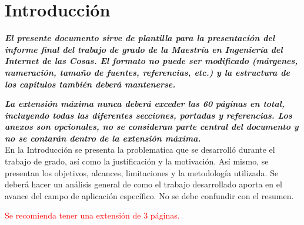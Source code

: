 \chapter{Introducción}\label{intro}

\textit{\textbf{El presente documento sirve de plantilla para la presentación del informe final del trabajo de grado de la Maestría en Ingeniería del Internet de las Cosas. El formato no puede ser modificado (márgenes, numeración, tamaño de fuentes, referencias, etc.) y la estructura de los capítulos también deberá mantenerse.}}

\textit{\textbf{La extensión máxima nunca deberá exceder las 60 páginas en total, incluyendo todas las diferentes secciones, portadas y referencias. Los anexos son opcionales, no se consideran parte central del documento y no se contarán dentro de la extensión máxima.}}\\[1.0cm]

En la Introducción se presenta la problematica que se desarrolló durante el trabajo de grado, así como la justificación y la motivación. Así mismo, se presentan los objetivos, alcances, limitaciones y la metodología utilizada. Se deberá hacer un análisis general de como el trabajo desarrollado aporta en el avance del campo de aplicación específico. No se debe confundir con el resumen.

\textcolor{red}{Se recomienda tener una extensión de $3$ páginas.}


